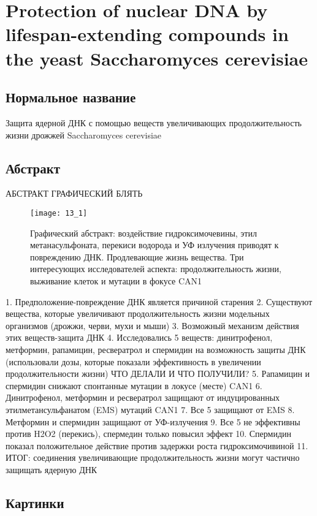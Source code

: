 \section{Protection of nuclear DNA by lifespan-extending compounds in the yeast Saccharomyces cerevisiae}

\subsection{Нормальное название}

Защита ядерной ДНК с помощью веществ увеличивающих продолжительность жизни дрожжей Saccharomyces cerevisiae

\subsection{Абстракт}

АБСТРАКТ ГРАФИЧЕСКИЙ БЛЯТЬ

\begin{figure}[H]
	\centering
	\texttt{[image: 13\_1]}
	\caption{Графический абстракт: воздействие гидроксимочевины, этил метанасульфоната, перекиси водорода и УФ излучения приводят к повреждению ДНК. Продлевающие жизнь вещества. Три интересующих исследователей аспекта: продолжительность жизни, выживание клеток и мутации в фокусе CAN1}
\end{figure}

1.	Предположение-повреждение ДНК является причиной старения
2.	Существуют вещества, которые увеличивают продолжительность жизни модельных организмов (дрожжи, черви, мухи и мыши)
3.	Возможный механизм действия этих веществ-защита ДНК
4.	Исследовались 5 веществ: динитрофенол, метформин, рапамицин, ресвератрол и спермидин на возможность защиты ДНК (использовали дозы, которые показали эффективность в увеличении продолжительности жизни)
ЧТО ДЕЛАЛИ И ЧТО ПОЛУЧИЛИ?
5.	Рапамицин и спермидин снижают спонтанные мутации в локусе (месте) CAN1
6.	Динитрофенол, метформин и ресвератрол защищают от индуцированных этилметансульфанатом (EMS) мутаций CAN1 
7.	Все 5 защищают от EMS
8.	Метформин и спермидин защищают от УФ-излучения
9.	Все 5 не эффективны против H2O2 (перекись), спермедин только повысил эффект 
10.	Спермидин показал положительное действие против задержки роста гидроксимочивиной 
11.	ИТОГ: соединения увеличивающие продолжительность жизни могут частично защищать ядерную ДНК


\subsection{Картинки}

